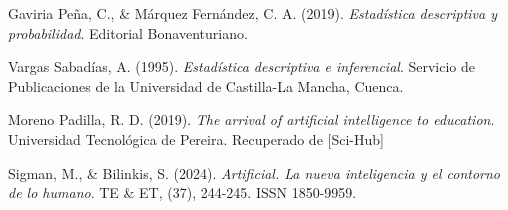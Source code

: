 \begin{thebibliography}{9}

  Gaviria Peña, C., \& Márquez Fernández, C. A. (2019). \textit{Estadística descriptiva y probabilidad}. Editorial Bonaventuriano. 
  
  Vargas Sabadías, A. (1995). \textit{Estadística descriptiva e inferencial}. Servicio de Publicaciones de la Universidad de Castilla-La Mancha, Cuenca.

  Moreno Padilla, R. D. (2019). \textit{The arrival of artificial intelligence to education}. Universidad Tecnológica de Pereira. Recuperado de [Sci-Hub]

  Sigman, M., \& Bilinkis, S. (2024). \textit{Artificial. La nueva inteligencia y el contorno de lo humano}. TE \& ET, (37), 244-245. ISSN 1850-9959.

\end{thebibliography}